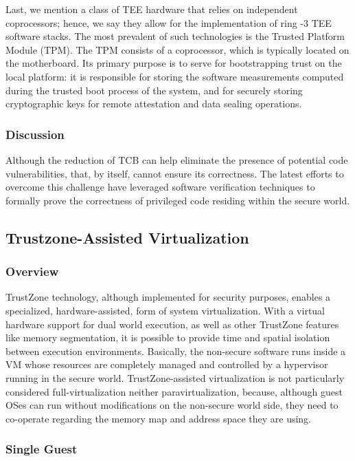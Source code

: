 \documentclass{article}
\begin{document}
Last, we mention a class of TEE hardware that relies on independent coprocessors; hence, we say they allow for the implementation of ring -3 TEE software stacks. The most prevalent of such technologies is the Trusted Platform Module (TPM). The TPM consists of a coprocessor, which is typically located on the motherboard. Its primary purpose is to serve for bootstrapping trust on the local platform: it is responsible for storing the software measurements computed during the trusted boot process of the system, and for securely storing cryptographic keys for remote attestation and data sealing operations.

\subsubsection{Discussion}

Although the reduction of TCB can help eliminate the presence of potential code vulnerabilities, that, by itself, cannot ensure its correctness. The latest efforts to overcome this challenge have leveraged software verification techniques to formally prove the correctness of privileged code residing within the secure world.

\subsection{Trustzone-Assisted Virtualization}

\subsubsection{Overview}

TrustZone technology, although implemented for security purposes, enables a specialized, hardware-assisted, form of system virtualization. With a virtual hardware support for dual world execution, as well as other TrustZone features like memory segmentation, it is possible to provide time and spatial isolation between execution environments. Basically, the non-secure software runs inside a VM whose resources are completely managed and controlled by a hypervisor running in the secure world. TrustZone-assisted virtualization is not particularly considered full-virtualization neither paravirtualization, because, although guest OSes can run without modifications on the non-secure world side, they need to co-operate regarding the memory map and address space they are using.

\subsubsection{Single Guest}
\end{document}

